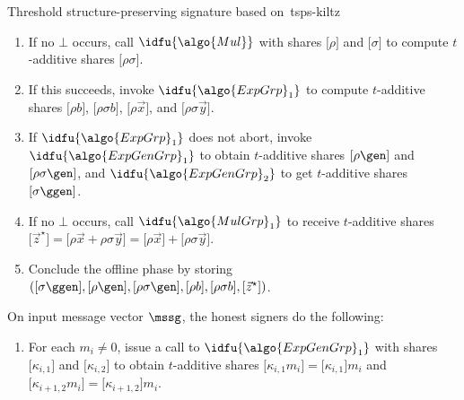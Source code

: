 \begin{protocolbox}{Threshold structure-preserving signature based
  on~\cite{C:KilPanWee15}}{tsps-kiltz}
\begin{description}
\begin{enumerate}
    \item If no $\bot$ occurs, call $\idfu{\algo{Mul}}$ with shares $\lbrack
      \rho\rbrack $ and $\lbrack \sigma\rbrack $ to compute $t$-additive shares
      $\lbrack \rho\sigma\rbrack $.

    \item If this succeeds, invoke $\idfu{\algo{ExpGrp}_1}$ to compute
      $t$-additive shares $\lbrack \rho{b}\rbrack $, $\lbrack
      \rho\sigma{b}\rbrack $, $\lbrack \rho\vec{{x}}\rbrack $, and $\lbrack
      \rho\sigma\vec{{y}}\rbrack $.

    \item If $\idfu{\algo{ExpGrp}_1}$ does not abort, invoke
      $\idfu{\algo{ExpGenGrp}_1}$ to obtain $t$-additive shares $\lbrack
      \rho\gen\rbrack $ and $\lbrack \rho\sigma\gen\rbrack $, and
      $\idfu{\algo{ExpGenGrp}_2}$ to get $t$-additive shares $\lbrack
      \sigma\ggen\rbrack $.

    \item If no $\bot$ occurs, call $\idfu{\algo{MulGrp}_1}$ to receive
      $t$-additive shares $\lbrack \vec{{z}}^{\star}\rbrack  = \lbrack
      \rho\vec{{x}} + \rho\sigma\vec{{y}}\rbrack = \lbrack \rho\vec{{x}}\rbrack
      +\lbrack \rho\sigma\vec{{y}}\rbrack $.

    \item Conclude the offline phase by storing $(\lbrack \sigma\ggen\rbrack ,
      \lbrack \rho\gen\rbrack , \lbrack \rho\sigma\gen\rbrack , \lbrack
      \rho{b}\rbrack , \lbrack \rho\sigma{b}\rbrack , \lbrack
      \vec{{z}}^{\star}\rbrack )$.

  \end{enumerate}

\item[$\lbrack \signature\rbrack _{\algo{OnSign}} \sample \algo{OnSign}(\mssg)$
  :] On input message vector $\mssg$, the honest signers do the following:

  \begin{enumerate}

    \item For each ${m}_i \neq 0$, issue a call to $\idfu{\algo{ExpGenGrp}_1}$
      with shares $\lbrack \kappa_{i, 1}\rbrack $ and $\lbrack \kappa_{i,
      2}\rbrack $ to obtain $t$-additive shares $\lbrack \kappa_{i, 1}
      {m}_i\rbrack  = \lbrack \kappa_{i, 1}\rbrack  {m}_i$ and $\lbrack
      \kappa_{i+1, 2} {m}_i\rbrack  = \lbrack \kappa_{i+1, 2}\rbrack {m}_i$.


\end{enumerate}
\end{description}
\end{protocolbox}
